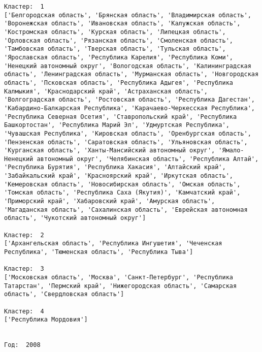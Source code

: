 \documentclass[11pt]{article}
\begin{document}
\begin{Verbatim}[commandchars=\\\{\}]
Кластер:  1
['Белгородская область', 'Брянская область', 'Владимирская область', 'Воронежская область', 'Ивановская область', 'Калужская область', 'Костромская область', 'Курская область', 'Липецкая область', 'Орловская область', 'Рязанская область', 'Смоленская область', 'Тамбовская область', 'Тверская область', 'Тульская область', 'Ярославская область', 'Республика Карелия', 'Республика Коми', 'Ненецкий автономный округ', 'Вологодская область', 'Калинингpадская область', 'Ленинградская область', 'Мурманская область', 'Новгородская область', 'Псковская область', 'Республика Адыгея', 'Республика Калмыкия', 'Краснодарский край', 'Астраханская область', 'Волгоградская область', 'Ростовская область', 'Республика Дагестан', 'Кабардино-Балкарская Республика', 'Карачаево-Черкесская Республика', 'Республика Северная Осетия', 'Ставропольский край', 'Республика Башкортостан', 'Республика Марий Эл', 'Удмуртская Республика', 'Чувашская Республика', 'Кировская область', 'Оренбургская область', 'Пензенская область', 'Саратовская область', 'Ульяновская область', 'Курганская область', 'Ханты-Мансийский автономный округ', 'Ямало-Ненецкий автономный округ', 'Челябинская область', 'Республика Алтай', 'Республика Бурятия', 'Республика Хакасия', 'Алтайский край', 'Забайкальский край', 'Красноярский край', 'Иркутская область', 'Кемеровская область', 'Новосибирская область', 'Омская область', 'Томская область', 'Республика Саха (Якутия)', 'Камчатский край', 'Приморский край', 'Хабаровский край', 'Амурская область', 'Магаданская область', 'Сахалинская область', 'Еврейская автономная область', 'Чукотский автономный округ']

Кластер:  2
['Архангельская область', 'Республика Ингушетия', 'Чеченская Республика', 'Тюменская область', 'Республика Тыва']

Кластер:  3
['Московская область', 'Москва', 'Санкт-Петербург', 'Республика Татарстан', 'Пермский край', 'Нижегородская область', 'Самарская область', 'Свердловская область']

Кластер:  4
['Республика Мордовия']


Год:  2008


\end{Verbatim}
\end{document}

